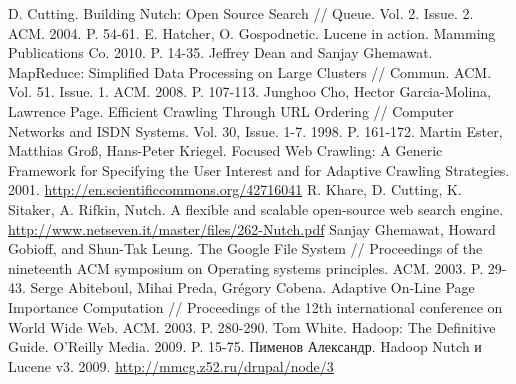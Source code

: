 \documentclass[a4paper,10pt]{report}
\begin{document}
\begin{thebibliography}{9}
 D. Cutting. Building Nutch: Open Source Search // Queue. Vol. 2. Issue. 2. ACM. 2004. P. 54-61.
 E. Hatcher, O. Gospodnetic. Lucene in action. Mamming Publications Co. 2010. P. 14-35.
 Jeffrey Dean and Sanjay Ghemawat. MapReduce: Simplified Data Processing on Large Clusters // Commun. ACM. Vol. 51. Issue. 1. ACM. 2008. P. 107-113.
 Junghoo Cho, Hector Garcia-Molina, Lawrence Page. Efficient Crawling Through URL Ordering // Computer Networks and ISDN Systems. Vol. 30, Issue. 1-7. 1998. P. 161-172.
 Martin Ester, Matthias Groß, Hans-Peter Kriegel. Focused Web Crawling: A Generic Framework for Specifying the User Interest and for Adaptive Crawling Strategies. 2001. \href{http://en.scientificcommons.org/42716041}{http://en.scientificcommons.org/42716041}
 R. Khare, D. Cutting, K. Sitaker, A. Rifkin, Nutch. A flexible and scalable open-source web search engine. \href{http://www.netseven.it/master/files/262-Nutch.pdf}{http://www.netseven.it/master/files/262-Nutch.pdf}
 Sanjay Ghemawat, Howard Gobioff, and Shun-Tak Leung. The Google File System // Proceedings of the nineteenth ACM symposium on Operating systems principles. ACM. 2003. P. 29-43.
 Serge Abiteboul, Mihai Preda, Grégory Cobena. Adaptive On-Line Page Importance Computation // Proceedings of the 12th international conference on World Wide Web. ACM. 2003. P. 280-290.
 Tom White. Hadoop: The Definitive Guide. O'Reilly Media. 2009. P. 15-75.
 Пименов Александр. Hadoop Nutch и Lucene v3. 2009. \href{http://mmcg.z52.ru/drupal/node/3}{http://mmcg.z52.ru/drupal/node/3}

\end{thebibliography}
\end{document}
